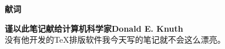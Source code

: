\begin{center}
\begin{LARGE}
\textbf{献词}
\end{LARGE}

\vspace{1cm}
{\large \textbf{\textcolor{green!60!black}{谨以此笔记献给计算机科学家Donald E. Knuth}}}
\\没有他开发的\TeX 排版软件我今天写的笔记就不会这么漂亮。
\end{center}